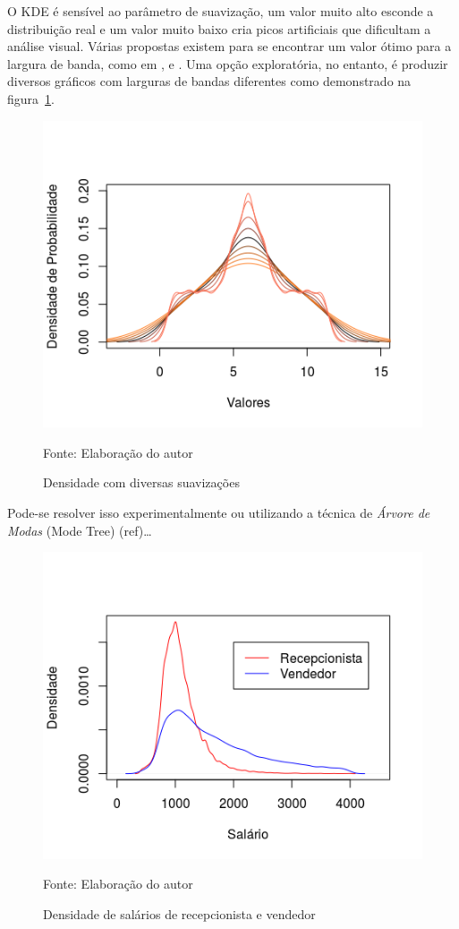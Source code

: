 \documentclass[12pt,a4paper]{article}
\newcommand{\source}[1]{\vspace{-10pt} \caption*{Fonte: {#1}} }
\begin{document}
O KDE é sensível ao parâmetro de suavização, um valor muito alto esconde a distribuição real e um valor muito baixo cria picos artificiais que dificultam a análise visual. Várias propostas existem para se encontrar um valor ótimo para a largura de banda, como em ,  e . Uma opção exploratória, no entanto, é produzir diversos gráficos com larguras de bandas diferentes como demonstrado na figura~\ref{fig:exemplo-de-kde-gradiente}.

\begin{figure}[ht]
  \centering
  \includegraphics[scale=0.8]{densidade4.png}
  \caption{Densidade com diversas suavizações}
  \label{fig:exemplo-de-kde-gradiente}
  \source{Elaboração do autor}
\end{figure}

Pode-se resolver isso experimentalmente ou utilizando a técnica de \textit{Árvore de Modas} (Mode Tree) (ref)\ldots

\begin{figure}[ht]
  \centering
  \includegraphics[scale=1]{salario_recepcionista_vendedor.png}
  \caption{Densidade de salários de recepcionista e vendedor}
  \label{fig:exemplo-de-kde-salario}
  \source{Elaboração do autor}
\end{figure}
\end{document}

